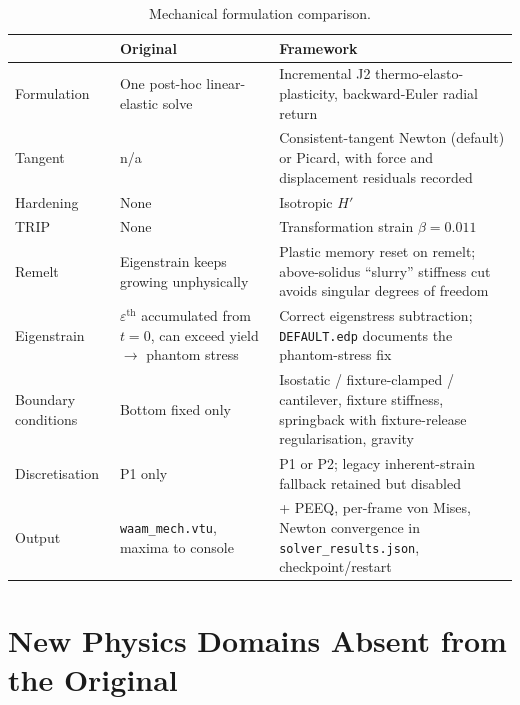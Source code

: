 \documentclass[10pt,a4paper]{article}
\newcommand{\code}[1]{\texttt{#1}}
\newcommand{\file}[1]{\texttt{\small #1}}
\begin{document}
\begin{table}[h!]
\centering
\caption{Mechanical formulation comparison.}
\label{tab:mech}
\small
\begin{tabularx}{\linewidth}{@{}l X X@{}}
\toprule
& \textbf{Original} & \textbf{Framework} \\
\midrule
Formulation & One post-hoc linear-elastic solve &
Incremental J2 thermo-elasto-plasticity, backward-Euler radial return \\
\addlinespace
Tangent & n/a & Consistent-tangent Newton (default) or Picard, with force and
displacement residuals recorded \\
\addlinespace
Hardening & None & Isotropic $H'$ \\
\addlinespace
TRIP & None & Transformation strain $\beta = 0.011$ \\
\addlinespace
Remelt & Eigenstrain keeps growing unphysically & Plastic memory reset on
remelt; above-solidus ``slurry'' stiffness cut avoids singular degrees of
freedom \\
\addlinespace
Eigenstrain & $\varepsilon^{\text{th}}$ accumulated from $t=0$, can exceed
yield $\rightarrow$ phantom stress & Correct eigenstress subtraction;
\file{DEFAULT.edp} documents the phantom-stress fix \\
\addlinespace
Boundary conditions & Bottom fixed only & Isostatic / fixture-clamped /
cantilever, fixture stiffness, springback with fixture-release regularisation,
gravity \\
\addlinespace
Discretisation & P1 only & P1 or P2; legacy inherent-strain fallback retained
but disabled \\
\addlinespace
Output & \code{waam\_mech.vtu}, maxima to console & + PEEQ, per-frame von
Mises, Newton convergence in \code{solver\_results.json}, checkpoint/restart \\
\bottomrule
\end{tabularx}
\end{table}

\section{New Physics Domains Absent from the Original}
\end{document}
